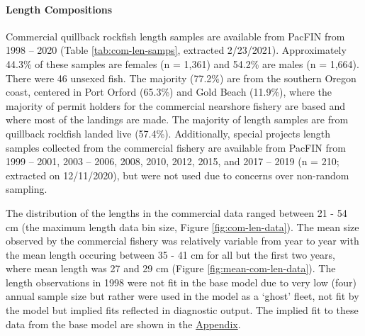 \documentclass[11pt,
  english,
  a4paper,
]{article}
\begin{document}
\leavevmode\tagmcend\tagstructend\par


\hypertarget{length-compositions}{%
\paragraph{Length Compositions}\label{length-compositions}}

\leavevmode\tagmcend\tagstructend


Commercial quillback rockfish length samples are available from PacFIN from 1998 -- 2020 (Table \ref{tab:com-len-samps}, extracted 2/23/2021). Approximately 44.3\% of these samples are females (n = 1,361) and 54.2\% are males (n = 1,664). There were 46 unsexed fish. The majority (77.2\%) are from the southern Oregon coast, centered in Port Orford (65.3\%) and Gold Beach (11.9\%), where the majority of permit holders for the commercial nearshore fishery are based and where most of the landings are made. The majority of length samples are from quillback rockfish landed live (57.4\%). Additionally, special projects length samples collected from the commercial fishery are available from PacFIN from 1999 -- 2001, 2003 -- 2006, 2008, 2010, 2012, 2015, and 2017 -- 2019 (n = 210; extracted on 12/11/2020), but were not used due to concerns over non-random sampling.

\leavevmode\tagmcend\tagstructend\par


The distribution of the lengths in the commercial data ranged between 21 - 54 cm (the maximum length data bin size, Figure \ref{fig:com-len-data}). The mean size observed by the commercial fishery was relatively variable from year to year with the mean length occuring between 35 - 41 cm for all but the first two years, where mean length was 27 and 29 cm (Figure \ref{fig:mean-com-len-data}). The length observations in 1998 were not fit in the base model due to very low (four) annual sample size but rather were used in the model as a `ghost' fleet, not fit by the model but implied fits reflected in diagnostic output. The implied fit to these data from the base model are shown in the {\protect\hyperlink{append_a}{Appendix}\leavevmode\tagmcend\tagstructend}.
\end{document}
